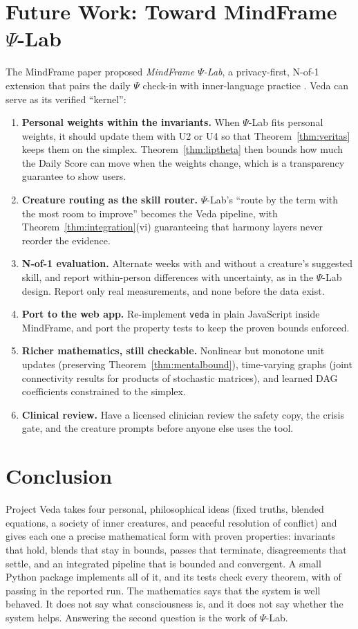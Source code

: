 \documentclass[11pt]{article}
\theoremstyle{definition}
\theoremstyle{remark}
\begin{document}
\section{Future Work: Toward MindFrame $\Psi$-Lab}\label{sec:future}
The MindFrame paper proposed \emph{MindFrame $\Psi$-Lab}, a privacy-first, N-of-1 extension that pairs the daily $\Psi$ check-in with inner-language practice \citep{espinosa2026mindframe}. Veda can serve as its verified ``kernel'':
\begin{enumerate}
\item \textbf{Personal weights within the invariants.} When $\Psi$-Lab fits personal weights, it should update them with U2 or U4 so that Theorem~\ref{thm:veritas} keeps them on the simplex. Theorem~\ref{thm:liptheta} then bounds how much the Daily Score can move when the weights change, which is a transparency guarantee to show users.
\item \textbf{Creature routing as the skill router.} $\Psi$-Lab's ``route by the term with the most room to improve'' becomes the Veda pipeline, with Theorem~\ref{thm:integration}(vi) guaranteeing that harmony layers never reorder the evidence.
\item \textbf{N-of-1 evaluation.} Alternate weeks with and without a creature's suggested skill, and report within-person differences with uncertainty, as in the $\Psi$-Lab design. Report only real measurements, and none before the data exist.
\item \textbf{Port to the web app.} Re-implement \texttt{veda} in plain JavaScript inside MindFrame, and port the property tests to keep the proven bounds enforced.
\item \textbf{Richer mathematics, still checkable.} Nonlinear but monotone unit updates (preserving Theorem~\ref{thm:mentalbound}), time-varying graphs (joint connectivity results for products of stochastic matrices), and learned DAG coefficients constrained to the simplex.
\item \textbf{Clinical review.} Have a licensed clinician review the safety copy, the crisis gate, and the creature prompts before anyone else uses the tool.
\end{enumerate}

\section{Conclusion}
Project Veda takes four personal, philosophical ideas (fixed truths, blended equations, a society of inner creatures, and peaceful resolution of conflict) and gives each one a precise mathematical form with proven properties: invariants that hold, blends that stay in bounds, passes that terminate, disagreements that settle, and an integrated pipeline that is bounded and convergent. A small Python package implements all of it, and its tests check every theorem, with \Npassed{} of \Npassed{} passing in the reported run. The mathematics says that the system is well behaved. It does not say what consciousness is, and it does not say whether the system helps. Answering the second question is the work of $\Psi$-Lab.
\end{document}
